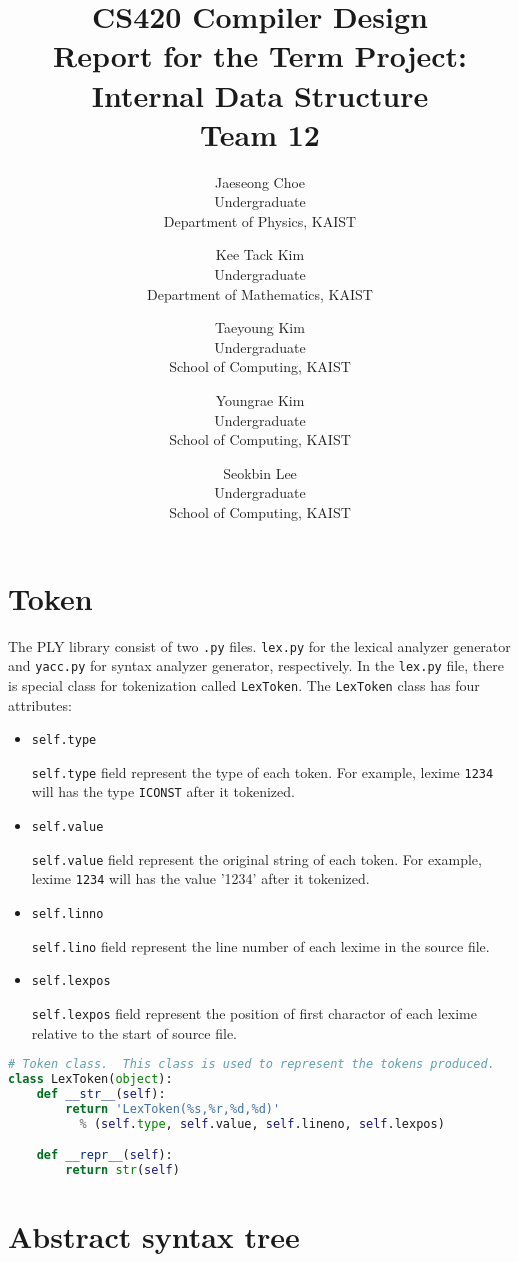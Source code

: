 \documentclass{article}
\title
{
	CS420 Compiler Design\\
	Report for the Term Project: Internal Data Structure\\
	${}$\\
	Team 12
}
\author
{
	Jaeseong Choe\\
	Undergraduate\\
	Department of Physics, KAIST
	\and
	Kee Tack Kim\\
	Undergraduate\\
	Department of Mathematics, KAIST
	\and
	Taeyoung Kim\\
	Undergraduate\\
	School of Computing, KAIST
	\and
	Youngrae Kim\\
	Undergraduate\\
	School of Computing, KAIST
	\and
	Seokbin Lee\\
	Undergraduate\\
	School of Computing, KAIST
}
\newcommand{\code}[1]{\texttt{#1}}
\begin{document}
	\maketitle

	\section{Token}

	The PLY library consist of two \code{.py} files. \code{lex.py} for the lexical analyzer generator and \code{yacc.py} for syntax analyzer generator, respectively. In the \code{lex.py} file, there is special class for tokenization called \code{LexToken}. The \code{LexToken} class has four attributes:

	\begin{itemize}
		\item \code{self.type}
		
		\code{self.type} field represent the type of each token. For example, lexime \code{1234} will has the type \code{ICONST} after it tokenized.

		\item \code{self.value}
		
		\code{self.value} field represent the original string of each token. For example, lexime \code{1234} will has the value '1234' after it tokenized.

		\item \code{self.linno}
		
		\code{self.lino} field represent the line number of each lexime in the source file.

		\item \code{self.lexpos}
		
		\code{self.lexpos} field represent the position of first charactor of each lexime relative to the start of source file.

	\end{itemize}

	\begin{lstlisting}[language=Python, basicstyle = \small]
# Token class.  This class is used to represent the tokens produced.
class LexToken(object):
    def __str__(self):
        return 'LexToken(%s,%r,%d,%d)'
          % (self.type, self.value, self.lineno, self.lexpos)

    def __repr__(self):
        return str(self)
	\end{lstlisting}


	\section{Abstract syntax tree}
\end{document}
